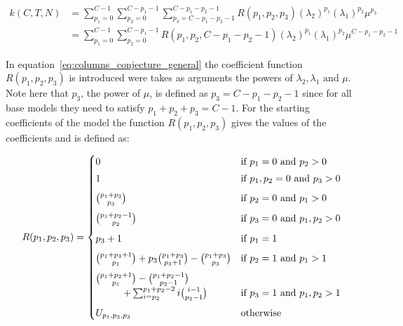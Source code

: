 \begin{align}\label{eq:columns_conjecture_general}
    k(C,T,N) &= \sum_{p_1=0}^{C-1} \sum_{p_2=0}^{C-p_1-1}
    \sum_{p_3=C - p_1 - p_2 - 1}^{C - p_1 - p_2 - 1} R(p_1, p_2, p_3)
    (\lambda_2)^{p_1} (\lambda_1)^{p_2} \mu^{p_3} \nonumber \\
    &= \sum_{p_1=0}^{C-1} \sum_{p_2=0}^{C-p_1-1} R(p_1, p_2, C-p_1-p_2-1)
    (\lambda_2)^{p_1} (\lambda_1)^{p_2} \mu^{C-p_1-p_2-1}
\end{align}

In equation~\eqref{eq:columns_conjecture_general} the coefficient function
\(R(p_1,p_2,p_3)\) is introduced were takes as arguments the powers of
\(\lambda_2, \lambda_1 \text{ and } \mu\).
Note here that \(p_3\), the power of \(\mu\), is defined as \(p_3=C-p_1-p_2-1\)
since for all base models they need to satisfy \(p_1 + p_2 + p_3 = C-1\).
For the starting coefficients of the model the function \(R(p_1,p_2,p_3)\) gives
the values of the coefficients and is defined as:

\begin{equation} \label{eq:coefficient_function}
    R(p_1,p_2,p_3) =
    \begin{cases}
        0 & \text{if } p_1 = 0 \text{ and } p_2 > 0 \vspace{0.1cm} \\
        1 & \text{if } p_1, p_2 = 0 \text{ and } p_3 > 0 \vspace{0.2cm} \\
        \binom{p_1 + p_3}{p_3} & \text{if } p_2 = 0
        \text{ and } p_1 > 0 \vspace{0.2cm} \\
        \binom{p_1 + p_2 - 1}{p_2} & \text{if } p_3 = 0
        \text{ and } p_1, p_2 > 0 \vspace{0.2cm} \\
        p_3 + 1 & \text{if } p_1 = 1 \vspace{0.2cm} \\
        \binom{p_1 + p_3 + 1}{p_1} + p_3 \binom{p_1 + p_3}{p_3+1} -
        \binom{p_1 + p_3}{p_3} & \text{if } p_2 = 1
        \text{ and } p_1 > 1 \vspace{0.2cm} \\
        \binom{p_1 + p_2 + 1}{p_1} - \binom{p_1 + p_2 - 1}{p_2-1} & \\
        \hspace{1cm} + \sum_{i=p_2}^{p_1 + p_2 - 2} i \binom{i-1}{p_2 - 1} &
        \text{if } p_3 = 1
        \text{ and } p_1,p_2 > 1 \vspace{0.2cm} \\
        U_{p_1,p_2,p_3} & \text{otherwise}
    \end{cases}
\end{equation}

